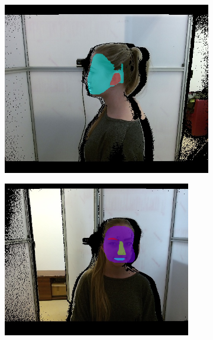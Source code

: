 \begin{figure}[H]
	\centering
	\begin{subfigure}[b]{0.49\textwidth}
		\centering
		\includegraphics[width=\textwidth]{figures/rcnn_detect1.png}
		\caption{}
		\label{fig:rcnn:label:a}
	\end{subfigure}
	\hskip 0.0in
	\begin{subfigure}[b]{0.49\textwidth}
		\centering
		\includegraphics[width=0.9\textwidth]{figures/rcnn_detect2.png}
		\caption{}
		\label{fig:rcnn:label:b}
	\end{subfigure}
	\begin{subfigure}[b]{0.49\textwidth}

\end{subfigure}
\end{figure}
